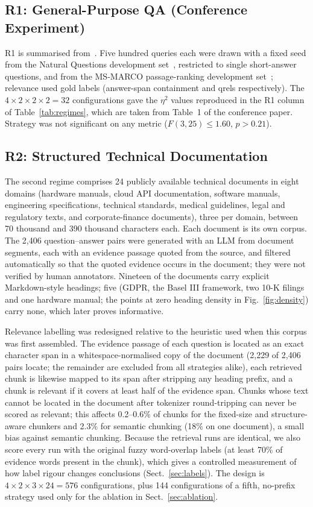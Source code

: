\documentclass[runningheads]{llncs}
\begin{document}
\subsection{R1: General-Purpose QA (Conference Experiment)}
\label{sec:r1}
R1 is summarised from~\cite{chauhan2026chunking}. Five hundred queries each were drawn with a fixed seed from the Natural Questions development set~\cite{kwiatkowski2019nq}, restricted to single short-answer questions, and from the MS-MARCO passage-ranking development set~\cite{nguyen2016msmarco}; relevance used gold labels (answer-span containment and qrels respectively). The $4\times2\times2\times2=32$ configurations gave the $\eta^2$ values reproduced in the R1 column of Table~\ref{tab:regimes}, which are taken from Table~1 of the conference paper. Strategy was not significant on any metric ($F(3,25)\le 1.60$, $p>0.21$).

\subsection{R2: Structured Technical Documentation}
\label{sec:r2}
The second regime comprises 24 publicly available technical documents in eight domains (hardware manuals, cloud API documentation, software manuals, engineering specifications, technical standards, medical guidelines, legal and regulatory texts, and corporate-finance documents), three per domain, between 70 thousand and 390 thousand characters each. Each document is its own corpus. The 2,406 question--answer pairs were generated with an LLM from document segments, each with an evidence passage quoted from the source, and filtered automatically so that the quoted evidence occurs in the document; they were not verified by human annotators. Nineteen of the documents carry explicit Markdown-style headings; five (GDPR, the Basel III framework, two 10-K filings and one hardware manual; the points at zero heading density in Fig.~\ref{fig:density}) carry none, which later proves informative.

Relevance labelling was redesigned relative to the heuristic used when this corpus was first assembled. The evidence passage of each question is located as an exact character span in a whitespace-normalised copy of the document (2,229 of 2,406 pairs locate; the remainder are excluded from all strategies alike), each retrieved chunk is likewise mapped to its span after stripping any heading prefix, and a chunk is relevant if it covers at least half of the evidence span. Chunks whose text cannot be located in the document after tokenizer round-tripping can never be scored as relevant; this affects 0.2--0.6\% of chunks for the fixed-size and structure-aware chunkers and 2.3\% for semantic chunking (18\% on one document), a small bias against semantic chunking. Because the retrieval runs are identical, we also score every run with the original fuzzy word-overlap labels (at least 70\% of evidence words present in the chunk), which gives a controlled measurement of how label rigour changes conclusions (Sect.~\ref{sec:labels}). The design is $4\times2\times3\times24=576$ configurations, plus 144 configurations of a fifth, no-prefix strategy used only for the ablation in Sect.~\ref{sec:ablation}.
\end{document}
